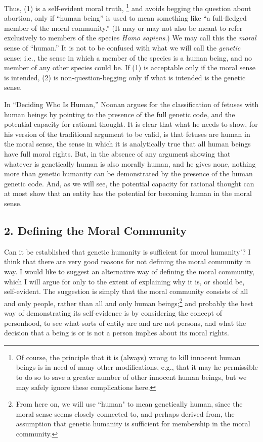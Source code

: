 Thus, (1) is a self-evident moral truth, \footnote{Of course, the principle that it is (always) wrong to kill
innocent human beings is in need of many other modifications,
e.g., that it may he permissible to do so to save a greater number
of other innocent human beings, but we may safely ignore these
complications here.} and avoids
begging the question about abortion, only if ``human
being” is used to mean something like ``a full-fledged
member of the moral community.” (It may or may not
also be meant to refer exclusively to members of the
species\emph{ Homo sapiens}.) We may call this the \emph{moral} sense
of ``human.” It is not to be confused with what we will
call the \emph{genetic} sense; i.e., the sense in which a member of
the species is a human being, and no member of any other
species could be. If (1) is acceptable only if the moral
sense is intended, (2) is non-question-begging only if
what is intended is the genetic sense.

In ``Deciding Who Is Human,” Noonan argues for the
classification of fetuses with human beings by pointing to
the presence of the full genetic code, and the potential
capacity for rational thought.\autocite[p. 135]{Noonan2} It is clear that what
he needs to show, for his version of the traditional
argument to be valid, is that fetuses are human in the
moral sense, the sense in which it is analytically true that
all human beings have full moral rights. But, in the
absence of any argument showing that whatever is
genetically human is also morally human, and he gives
none, nothing more than genetic humanity can be
demonstrated by the presence of the human genetic code.
And, as we will see, the potential capacity for rational
thought can at most show that an entity has the potential
for becoming human in the moral sense.

\subsection{2. Defining the Moral Community}

Can it be established that genetic humanity is sufficient
for moral humanity’? I think that there are very good
reasons for not defining the moral community in way. I
would like to suggest an alternative way of defining the
moral community, which I will argue for only to the
extent of explaining why it is, or should be, self-evident.
The suggestion is simply that the moral community
consists of all and only people, rather than all and only
human beings;\footnote{From here on, we will use ``human" to mean genetically
human, since the moral sense seems closely connected to, and perhaps derived from, the assumption that genetic humanity is
sufficient for membership in the moral community.} and probably the best way of
demonstrating its self-evidence is by considering the
concept of personhood, to see what sorts of entity are and
are not persons, and what the decision that a being is or is
not a person implies about its moral rights.

